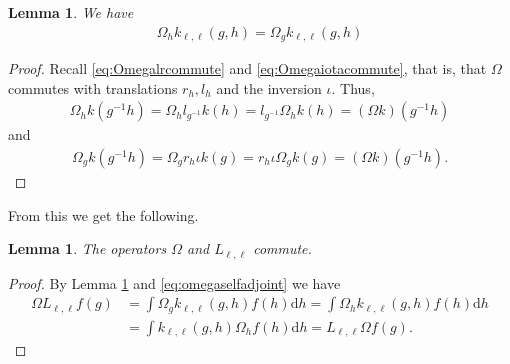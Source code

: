 \documentclass[12pt]{amsart}
\newtheorem{lemma}[theorem]{Lemma}
\theoremstyle{definition}
\theoremstyle{remark}
\numberwithin{equation}{section}
\newcommand{\1}{{\mathbf 1}}
\renewcommand{\d}{\mathrm d}
\begin{document}
\begin{lemma} \label{le:omegahtog}
    We have 
    \begin{align*}
        \Omega_h k_{\ell,\ell}(g,h)=\Omega_g k_{\ell,\ell}(g,h)
    \end{align*}

\end{lemma}
\begin{proof}




Recall \eqref{eq:Omegalrcommute} and \eqref{eq:Omegaiotacommute}, that is, that $\Omega$ commutes with translations $r_h,l_h$ and the inversion $\iota$. Thus,
\begin{align*}
    \Omega_h k(g^{-1}h) = \Omega_h l_{g^{-1}} k(h) = l_{g^{-1}}  \Omega_h k(h) = (\Omega k) (g^{-1}h)
\end{align*}
and
\begin{align*}
    \Omega_g k(g^{-1}h) = \Omega_g  r_h\iota k(g) = r_h\iota \Omega_g k(g)  = (\Omega k) (g^{-1}h).
\end{align*}
\end{proof}
From this we get the following.
\begin{lemma}
 The operators $\Omega$ and $L_{\ell,\ell}$ commute.
\end{lemma}
\begin{proof}
By Lemma \ref{le:omegahtog} and \eqref{eq:omegaselfadjoint} we have
\begin{align*}
   \Omega  L_{\ell,\ell} f (g) &= \int  \Omega_g k_{\ell,\ell}(g,h) f(h) \d h  =\int  \Omega_h k_{\ell,\ell}(g,h) f(h) \d h  \\
 & 
   =\int   k_{\ell,\ell}(g,h)\Omega_h f(h) \d h  =     L_{\ell,\ell} \Omega f (g).
\end{align*}
\end{proof}
\end{document}
